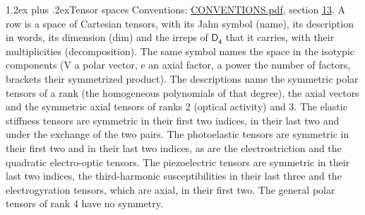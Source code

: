 \documentclass[10pt,a4paper]{article}
\makeatletter
\renewcommand\section{\@startsection{section}{1}{\z@}{-3ex plus -1ex minus -.2ex}%
  {1.2ex plus .2ex}{\normalfont\large\sffamily\bfseries\color{parttitle}}}
\numberwithin{equation}{section}
\newcommand{\grp}[1]{\mathsf{#1}}
\makeatother
\begin{document}
\section{Tensor spaces}\label{s:tensor_spaces}
Conventions: \href{../../CONVENTIONS.pdf}{CONVENTIONS.pdf}, section \href{../../CONVENTIONS.pdf\#conv.13}{13}.
\leavevmode\label{n:head.name}\label{n:head.description}\label{n:head.dim}\label{n:head.decomposition}A row is a space of Cartesian tensors, with its Jahn symbol (name), its description in words, its dimension (dim) and the irreps of $\grp{D_{4}}$ that it carries, with their multiplicities (decomposition). \label{n:label.jahn}The same symbol names the space in the isotypic components (V a polar vector, e an axial factor, a power the number of factors, brackets their symmetrized product). The descriptions name the symmetric polar tensors of a rank (the homogeneous polynomials of that degree), the axial vectors and the symmetric axial tensors of ranks 2 (optical activity) and 3. The elastic stiffness tensors are symmetric in their first two indices, in their last two and under the exchange of the two pairs. The photoelastic tensors are symmetric in their first two and in their last two indices, as are the electrostriction and the quadratic electro-optic tensors. The piezoelectric tensors are symmetric in their last two indices, the third-harmonic susceptibilities in their last three and the electrogyration tensors, which are axial, in their first two. The general polar tensors of rank 4 have no symmetry.
\end{document}
